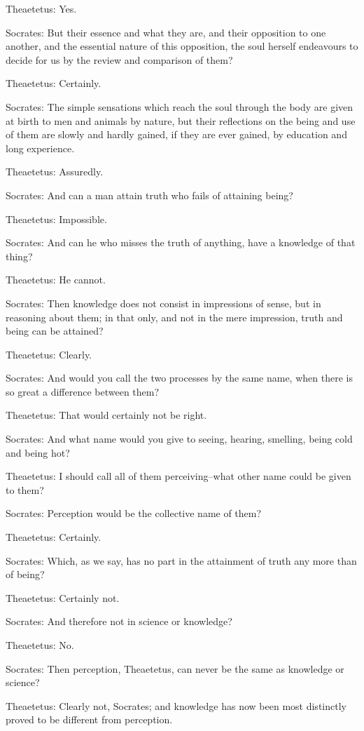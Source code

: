 Theaetetus: Yes.

Socrates: But their essence and what they are, and their opposition
to one another, and the essential nature of this opposition, the soul
herself endeavours to decide for us by the review and comparison of
them?

Theaetetus: Certainly.

Socrates: The simple sensations which reach the soul through the body
are given at birth to men and animals by nature, but their reflections
on the being and use of them are slowly and hardly gained, if they are
ever gained, by education and long experience.

Theaetetus: Assuredly.

Socrates: And can a man attain truth who fails of attaining being?

Theaetetus: Impossible.

Socrates: And can he who misses the truth of anything, have a knowledge
of that thing?

Theaetetus: He cannot.

Socrates: Then knowledge does not consist in impressions of sense, but
in reasoning about them; in that only, and not in the mere impression,
truth and being can be attained?

Theaetetus: Clearly.

Socrates: And would you call the two processes by the same name, when
there is so great a difference between them?

Theaetetus: That would certainly not be right.

Socrates: And what name would you give to seeing, hearing, smelling,
being cold and being hot?

Theaetetus: I should call all of them perceiving--what other name could
be given to them?

Socrates: Perception would be the collective name of them?

Theaetetus: Certainly.

Socrates: Which, as we say, has no part in the attainment of truth any
more than of being?

Theaetetus: Certainly not.

Socrates: And therefore not in science or knowledge?

Theaetetus: No.

Socrates: Then perception, Theaetetus, can never be the same as
knowledge or science?

Theaetetus: Clearly not, Socrates; and knowledge has now been most
distinctly proved to be different from perception.

